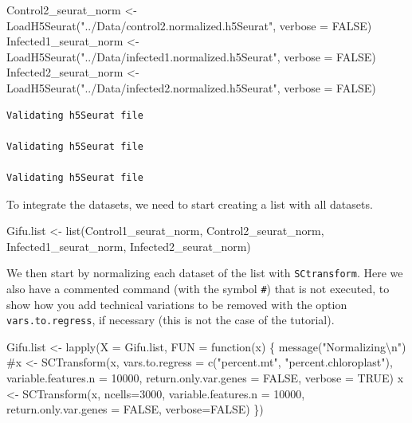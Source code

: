 \documentclass[
  letterpaper,
  DIV=11,
  numbers=noendperiod]{scrartcl}
\newenvironment{Shaded}{\begin{snugshade}}{\end{snugshade}}
\newcommand{\AttributeTok}[1]{\textcolor[rgb]{0.40,0.45,0.13}{#1}}
\newcommand{\CommentTok}[1]{\textcolor[rgb]{0.37,0.37,0.37}{#1}}
\newcommand{\ConstantTok}[1]{\textcolor[rgb]{0.56,0.35,0.01}{#1}}
\newcommand{\ControlFlowTok}[1]{\textcolor[rgb]{0.00,0.23,0.31}{#1}}
\newcommand{\DecValTok}[1]{\textcolor[rgb]{0.68,0.00,0.00}{#1}}
\newcommand{\FunctionTok}[1]{\textcolor[rgb]{0.28,0.35,0.67}{#1}}
\newcommand{\NormalTok}[1]{\textcolor[rgb]{0.00,0.23,0.31}{#1}}
\newcommand{\OtherTok}[1]{\textcolor[rgb]{0.00,0.23,0.31}{#1}}
\newcommand{\SpecialCharTok}[1]{\textcolor[rgb]{0.37,0.37,0.37}{#1}}
\newcommand{\StringTok}[1]{\textcolor[rgb]{0.13,0.47,0.30}{#1}}
\begin{document}
\begin{Shaded}
\begin{Highlighting}[]
\NormalTok{Control2\_seurat\_norm }\OtherTok{\textless{}{-}} \FunctionTok{LoadH5Seurat}\NormalTok{(}\StringTok{"../Data/control2.normalized.h5Seurat"}\NormalTok{, }\AttributeTok{verbose =} \ConstantTok{FALSE}\NormalTok{)}
\NormalTok{Infected1\_seurat\_norm }\OtherTok{\textless{}{-}} \FunctionTok{LoadH5Seurat}\NormalTok{(}\StringTok{"../Data/infected1.normalized.h5Seurat"}\NormalTok{, }\AttributeTok{verbose =} \ConstantTok{FALSE}\NormalTok{)}
\NormalTok{Infected2\_seurat\_norm }\OtherTok{\textless{}{-}} \FunctionTok{LoadH5Seurat}\NormalTok{(}\StringTok{"../Data/infected2.normalized.h5Seurat"}\NormalTok{, }\AttributeTok{verbose =} \ConstantTok{FALSE}\NormalTok{)}
\end{Highlighting}
\end{Shaded}

\begin{verbatim}
Validating h5Seurat file

Validating h5Seurat file

Validating h5Seurat file
\end{verbatim}

To integrate the datasets, we need to start creating a list with all
datasets.

\begin{Shaded}
\begin{Highlighting}[]
\NormalTok{Gifu.list }\OtherTok{\textless{}{-}} \FunctionTok{list}\NormalTok{(Control1\_seurat\_norm, }
\NormalTok{                  Control2\_seurat\_norm, }
\NormalTok{                  Infected1\_seurat\_norm, }
\NormalTok{                  Infected2\_seurat\_norm)}
\end{Highlighting}
\end{Shaded}

We then start by normalizing each dataset of the list with
\texttt{SCtransform}. Here we also have a commented command (with the
symbol \texttt{\#}) that is not executed, to show how you add technical
variations to be removed with the option \texttt{vars.to.regress}, if
necessary (this is not the case of the tutorial).

\begin{Shaded}
\begin{Highlighting}[]
\NormalTok{Gifu.list }\OtherTok{\textless{}{-}} \FunctionTok{lapply}\NormalTok{(}\AttributeTok{X =}\NormalTok{ Gifu.list, }\AttributeTok{FUN =} \ControlFlowTok{function}\NormalTok{(x) \{}
  \FunctionTok{message}\NormalTok{(}\StringTok{"Normalizing}\SpecialCharTok{\textbackslash{}n}\StringTok{"}\NormalTok{)}
  \CommentTok{\#x \textless{}{-} SCTransform(x, vars.to.regress = c("percent.mt",  "percent.chloroplast"), variable.features.n = 10000, return.only.var.genes = FALSE, verbose = TRUE)}
\NormalTok{  x }\OtherTok{\textless{}{-}} \FunctionTok{SCTransform}\NormalTok{(x, }\AttributeTok{ncells=}\DecValTok{3000}\NormalTok{, }\AttributeTok{variable.features.n =} \DecValTok{10000}\NormalTok{, }\AttributeTok{return.only.var.genes =} \ConstantTok{FALSE}\NormalTok{, }\AttributeTok{verbose=}\ConstantTok{FALSE}\NormalTok{)}
\NormalTok{\})}
\end{Highlighting}
\end{Shaded}
\end{document}
